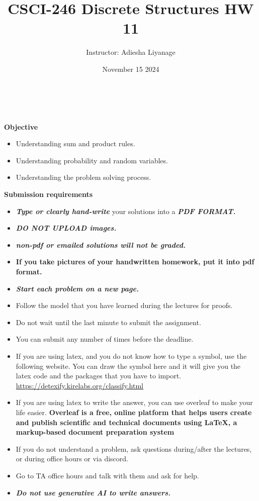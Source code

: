 \documentclass[12pt]{exam}
\title{CSCI-246 Discrete Structures HW 11}
\author{Instructor: Adiesha Liyanage}
\date{November 15 2024}
\begin{document}
\maketitle

\hrulefill
\\
\\
\textbf{Objective}
\begin{itemize}
    \item Understanding sum and product rules.
    \item Understanding probability and random variables.
    \item Understanding the problem solving process.
\end{itemize}

\textbf{Submission requirements}
\begin{itemize}
    \item \textbf{\textit{Type or clearly hand-write}} your solutions into a \textbf{\textit{PDF FORMAT.}} 
    \item \textbf{\textit{DO NOT UPLOAD images.}}
    \item \textbf{\textit{non-pdf or emailed solutions will not be graded.}}
    \item \textbf{If you take pictures of your handwritten homework, put it into pdf format.}
    \item \textbf{\textit{Start each problem on a new page.}}
    \item Follow the model that you have learned during the lectures for proofs.
    \item Do not wait until the last minute to submit the assignment.
    \item You can submit any number of times before the deadline. 
    \item If you are using latex, and you do not know how to type a symbol, use the following website. You can draw the symbol here and it will give you the latex code and the packages that you have to import. \url{https://detexify.kirelabs.org/classify.html}
    \item If you are using latex to write the answer, you can use overleaf to make your life easier. \textbf{Overleaf is a free, online platform that helps users create and publish scientific and technical documents using LaTeX, a markup-based document preparation system}
    \item If you do not understand a problem, ask questions during/after the lectures, or during office hours or via discord.
    \item Go to TA office hours and talk with them and ask for help.
    \item \textbf{\textit{Do not use generative AI to write answers.}} 
\end{itemize}
\end{document}
